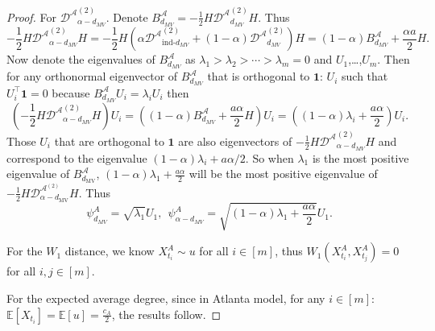 \documentclass[12pt]{article}
\newcommand{\RR}{\mathbb{R}}
\newcommand{\EE}{\mathbb{E}}
\theoremstyle{definition}
\begin{document}
\begin{proof}
For $ \mathcal{D^A}_{\alpha -d_{MV}}^{(2)}$. Denote $B^{\mathcal{A}}_{d_{MV}} = -\frac{1}{2} H \mathcal{D^A}_{d_{MV}}^{(2)}  H$. Thus 
$$
-\frac{1}{2} H \mathcal{D^A}_{\alpha -d_{MV}}^{(2)} H = 
-\frac{1}{2} H \left( \alpha \mathcal{D^A}_{\text{ind-}d_{MV}}^{(2)} +(1-\alpha) \mathcal{D^A}_{d_{MV}}^{(2)}  \right) H
= (1-\alpha)B^{\mathcal{A}}_{d_{MV}}  + \frac{\alpha a }{2}H.
$$ 
Now denote the eigenvalues of $B^{\mathcal{A}}_{d_{MV}}$ as $\lambda_1>\lambda_2>\cdots>\lambda_m = 0$ and $U_1$,\ldots,$U_m$. Then for any orthonormal eigenvector of $B^{\mathcal{A}}_{d_{MV}}$ that is orthogonal to $\mathbf{1}$: $U_i$ such that $U^{\top}_i\mathbf{1} = 0$ because $B^{\mathcal{A}}_{d_{MV}} U_i  = \lambda_i U_i$ then
$$
\left(-\frac{1}{2} H \mathcal{D^A}_{\alpha -d_{MV}}^{(2)} H \right)U_i = \left( (1- \alpha) B^{\mathcal{A}}_{d_{MV}} + \frac{a\alpha}{2}H \right) U_i = \left((1-\alpha)\lambda_i + \frac{a \alpha}{2}\right)U_i.
$$ 
Those $U_i$ that are  orthogonal to $\mathbf{1}$ are also eigenvectors of $-\frac{1}{2} H \mathcal{D^A}_{\alpha -d_{MV}}^{(2)} H $ and correspond to the eigenvalue $(1-\alpha)\lambda_i + a \alpha/2$. So when $\lambda_1$ is the most positive eigenvalue of $B_{d_{\mathrm{MV}}}^{\mathcal{A}}$, $(1-\alpha)\lambda_1 + \frac{a \alpha}{2}$ will be the most positive eigenvalue of $-\frac{1}{2}H\mathcal{D}^{\mathcal{A}^{(2)}}_{\alpha-d_{\mathrm{MV}}}H.$ Thus 
$$
\psi^A_{d_{MV}} = \sqrt{\lambda_1} U_1, ~~ \psi^A_{\alpha -d_{MV}} = \sqrt{ (1-\alpha)\lambda_1 + \frac{a \alpha}{2} } U_1.
$$

For the $W_1$ distance, we know $X^A_{t_i} \sim u$ for all $i \in[m]$, thus $W_1(X^A_{t_i},X^A_{t_j}) = 0$ for all $i,j \in [m]$. 

For the expected average degree, since in Atlanta model, for any $i\in[m]$: $\EE[X_{t_i}] = \EE [u] = \frac{c_A}{2}$, the results follow. 

\end{proof}
\end{document}
